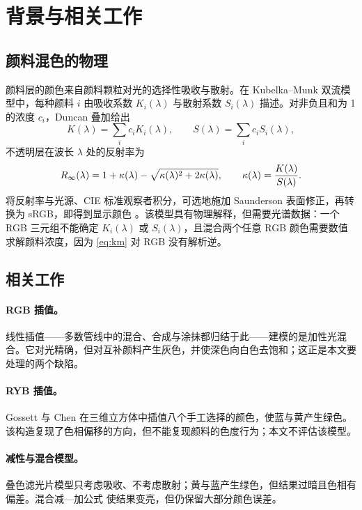 \section{背景与相关工作}
\label{sec:background}

\subsection{颜料混色的物理}
\label{sec:km}

颜料层的颜色来自颜料颗粒对光的选择性吸收与散射。在 Kubelka--Munk 双流模型中，每种颜料 $i$ 由吸收系数 $K_i(\lambda)$ 与散射系数 $S_i(\lambda)$ 描述。对非负且和为 1 的浓度 $c_i$，Duncan 叠加给出
\begin{equation}
K(\lambda)=\sum_i c_i K_i(\lambda),\qquad
S(\lambda)=\sum_i c_i S_i(\lambda),
\label{eq:duncan}
\end{equation}
不透明层在波长 $\lambda$ 处的反射率为
\begin{equation}
R_{\infty}(\lambda)=1+\kappa(\lambda)-\sqrt{\kappa(\lambda)^{2}+2\kappa(\lambda)},
\qquad \kappa(\lambda)=\frac{K(\lambda)}{S(\lambda)}.
\label{eq:km}
\end{equation}
将反射率与光源、CIE 标准观察者积分，可选地施加 Saunderson 表面修正，再转换为 sRGB，即得到显示颜色 \cite{saunderson1942,haase1992,wyszecki2000}。该模型具有物理解释，但需要光谱数据：一个 RGB 三元组不能确定 $K_i(\lambda)$ 或 $S_i(\lambda)$，且混合两个任意 RGB 颜色需要数值求解颜料浓度，因为 \cref{eq:km} 对 RGB 没有解析逆。

\subsection{相关工作}
\label{sec:related}

\paragraph{RGB 插值。}
线性插值——多数管线中的混合、合成与涂抹都归结于此——建模的是加性光混合。它对光精确，但对互补颜料产生灰色，并使深色向白色去饱和；这正是本文要处理的两个缺陷。

\paragraph{RYB 插值。}
Gossett 与 Chen \cite{gossett2004} 在三维立方体中插值八个手工选择的颜色，使蓝与黄产生绿色。该构造复现了色相偏移的方向，但不能复现颜料的色度行为；本文不评估该模型。

\paragraph{减性与混合模型。}
叠色滤光片模型只考虑吸收、不考虑散射；黄与蓝产生绿色，但结果过暗且色相有偏差。混合减—加公式 \cite{simonot2014} 使结果变亮，但仍保留大部分颜色误差。

